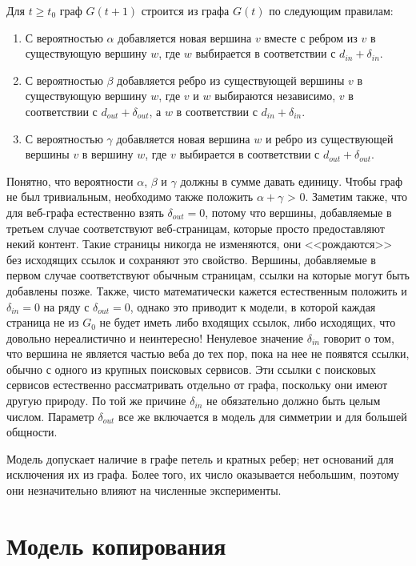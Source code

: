 \documentclass[14pt]{extreport}
\begin{document}
Для $t \ge t_0$ граф $G(t+1)$ строится из графа $G(t)$ по следующим правилам:
\begin{enumerate}
\item С вероятностью $\alpha$ добавляется новая вершина $v$ вместе с ребром из $v$ в существующую вершину $w$, где $w$ выбирается в соответствии с $d_{in} + \delta_{in}$.
\item С вероятностью $\beta$ добавляется ребро из существующей вершины $v$ в существующую вершину $w$, где $v$ и $w$ выбираются независимо, $v$ в соответствии с $d_{out} + \delta_{out}$, а $w$ в соответствии с $d_{in} + \delta_{in}$.
\item С вероятностью $\gamma$ добавляется новая вершина $w$ и ребро из существующей вершины $v$ в вершину $w$, где $v$ выбирается в соответствии с $d_{out} + \delta_{out}$.
\end{enumerate}

Понятно, что вероятности $\alpha$, $\beta$ и $\gamma$ должны в сумме давать единицу. Чтобы граф не был тривиальным, необходимо также положить $\alpha + \gamma$ > 0. Заметим также, что для веб-графа естественно взять $\delta_{out} = 0$, потому что вершины, добавляемые в третьем случае соответствуют веб-страницам, которые просто предоставляют некий контент. Такие страницы никогда не изменяются, они <<рождаются>> без исходящих ссылок и сохраняют это свойство. Вершины, добавляемые в первом случае соответствуют обычным страницам, ссылки на которые могут быть добавлены позже. Также, чисто математически кажется естественным положить и $\delta_{in} = 0$ на ряду с $\delta_{out} = 0$, однако это приводит к модели, в которой каждая страница не из $G_0$ не будет иметь либо входящих ссылок, либо исходящих, что довольно нереалистично и неинтересно! Ненулевое значение $\delta_{in}$ говорит о том, что вершина не является частью веба до тех пор, пока на нее не появятся ссылки, обычно с одного из крупных поисковых сервисов. Эти ссылки с поисковых сервисов естественно рассматривать отдельно от графа, поскольку они имеют другую природу. По той же причине $\delta_{in}$ не обязательно должно быть целым числом. Параметр $\delta_{out}$ все же включается в модель для симметрии и для большей общности.

Модель допускает наличие в графе петель и кратных ребер; нет оснований для исключения их из графа. Более того, их число оказывается небольшим, поэтому они незначительно влияют на численные эксперименты. 

\section{Модель копирования}
\end{document}
